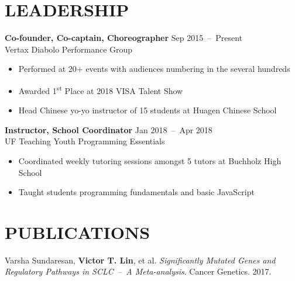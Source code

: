 \documentclass[line,resmargin]{res}
\begin{document}
\begin{resume}
\section{LEADERSHIP}
    \textbf{Co-founder, Co-captain, Choreographer}    \hfill Sep 2015~--~Present \\
    Vertax Diabolo Performance Group
    \begin{itemize}  \itemsep -2pt
        \item Performed at 20+ events with audiences numbering in the several hundreds
        \item Awarded 1\textsuperscript{st} Place at 2018 VISA Talent Show
        \item Head Chinese yo-yo instructor of 15 students at Huagen Chinese School
    \end{itemize}

    \textbf{Instructor, School Coordinator}    \hfill Jan 2018~--~Apr 2018 \\
    UF Teaching Youth Programming Essentials
    \begin{itemize}  \itemsep -2pt
        \item Coordinated weekly tutoring sessions amongst 5 tutors at Buchholz High School
        \item Taught students programming fundamentals and basic JavaScript
    \end{itemize}

\section{PUBLICATIONS}
    Varsha Sundaresan, \textbf{Victor T. Lin}, et al.
    \textit{Significantly Mutated Genes and Regulatory Pathways in SCLC~--~A Meta-analysis}. Cancer Genetics. 2017.

\end{resume}
\end{document}
